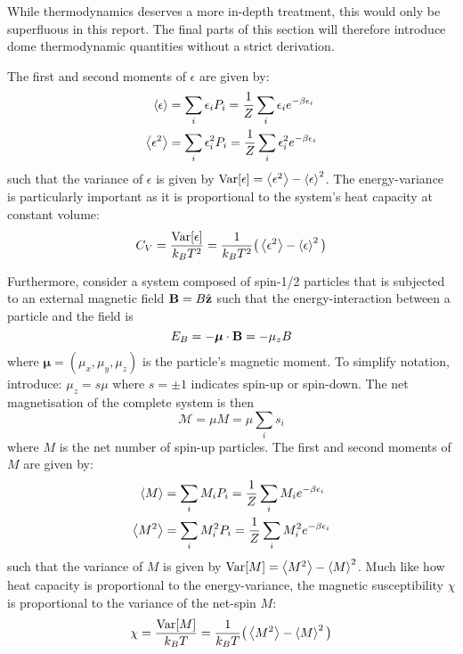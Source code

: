\documentclass[nofootinbib,reprint,english]{revtex4-1}
\begin{document}
While thermodynamics deserves a more in-depth treatment, this would only be superfluous in this report. The final parts of this section will therefore introduce dome thermodynamic quantities without a strict derivation.

The first and second moments of \(\epsilon\) are given by:
\begin{subequations}
\begin{align}
\expval{\epsilon}  &=\sum_i\epsilon_iP_i=\frac{1}{Z}\sum_i\epsilon_ie^{-\beta\epsilon_i}\\
\expval{\epsilon^2}&=\sum_i\epsilon_i^2P_i=\frac{1}{Z}\sum_i\epsilon_i^2e^{-\beta\epsilon_i}
\end{align}
\end{subequations}
such that the variance of \(\epsilon\) is given by \(\text{Var}[\epsilon]=\expval{\epsilon^2}-\expval{\epsilon}^2\). The energy-variance is particularly important as it is proportional to the system's heat capacity at constant volume:
\begin{equation}
C_V=\frac{\text{Var}[\epsilon]}{k_BT^2}=\frac{1}{k_BT^2}\big(\expval{\epsilon^2}-\expval{\epsilon}^2\big)
\end{equation}

Furthermore, consider a system composed of spin-1/2 particles that is subjected to an external magnetic field \(\vb{B}=B\hat{\vb{z}}\) such that the energy-interaction between a particle and the field is
\begin{equation}
E_B=-\boldsymbol{\mu}\cdot\vb{B}=-\mu_zB
\end{equation}
where \(\boldsymbol{\mu}=(\mu_x,\mu_y,\mu_z)\) is the particle's magnetic moment. To simplify notation, introduce: \(\mu_z=s\mu\) where \(s=\pm1\) indicates spin-up or spin-down. The net magnetisation of the complete system is then
\begin{equation}
\mathcal{M}=\mu M=\mu\sum_is_i
\end{equation}
where \(M\) is the net number of spin-up particles. The first and second moments of \(M\) are given by:
\begin{subequations}
\begin{align}
\expval{M}  &=\sum_iM_iP_i=\frac{1}{Z}\sum_iM_ie^{-\beta\epsilon_i}\\
\expval{M^2}&=\sum_iM_i^2P_i=\frac{1}{Z}\sum_iM_i^2e^{-\beta\epsilon_i}
\end{align}
\end{subequations}
such that the variance of \(M\) is given by \(\text{Var}[M]=\expval{M^2}-\expval{M}^2\). Much like how heat capacity is proportional to the energy-variance, the magnetic susceptibility \(\chi\) is proportional to the variance of the net-spin \(M\):
\begin{equation}
\chi=\frac{\text{Var}[M]}{k_BT}=\frac{1}{k_BT}\big(\expval{M^2}-\expval{M}^2\big)
\end{equation}
\end{document}

